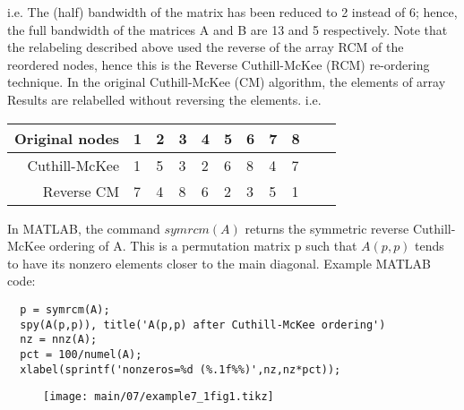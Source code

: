   \rmfamily
  \vskip 12pt
  \noindent
  i.e. The (half) bandwidth of the matrix has been reduced to 2 instead of 6;
  hence, the full bandwidth of the matrices A and B are 13 and 5 respectively.
  \vskip 12pt
  \noindent
  Note that the relabeling described above used the reverse of the array RCM of
  the reordered nodes, hence this is the Reverse Cuthill-McKee (RCM) re-ordering
  technique.  In the original Cuthill-McKee (CM) algorithm, the elements of array
  Results are relabelled without reversing the elements. i.e.
  \vskip 10pt
  \noindent
  \begin{center}
      \begin{tabular}{ r | l l l l l l l l l l }
      Original nodes  & 1 & 2 & 3 & 4 & 5 & 6 & 7 & 8 \\
      \hline
      Cuthill-McKee   & 1 & 5 & 3 & 2 & 6 & 8 & 4 & 7 \\
      Reverse CM      & 7 & 4 & 8 & 6 & 2 & 3 & 5 & 1 \\
      \end{tabular}
  \end{center}
  \noindent
  \vskip 10pt
  
  \noindent
  In MATLAB, the command $symrcm(A)$ returns the symmetric reverse Cuthill-McKee
  ordering of A. This is a permutation matrix p such that $A(p,p)$ tends to have
  its nonzero elements closer to the main diagonal.
  \vskip 6pt
  \noindent
  Example MATLAB code:
  \noindent
  \begin{lstlisting}
  p = symrcm(A);
  spy(A(p,p)), title('A(p,p) after Cuthill-McKee ordering')
  nz = nnz(A);
  pct = 100/numel(A);
  xlabel(sprintf('nonzeros=%d (%.1f%%)',nz,nz*pct));
  \end{lstlisting}
  
  \begin{figure}[H]
    \begin{center}
        \scriptsize\texttt{[image: main/07/example7\_1fig1.tikz]}
    \end{center}
  \end{figure}
  
